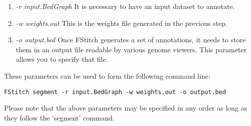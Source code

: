 \documentclass[12pt,letterpaper]{article}
\begin{document}
\begin{enumerate}
 \item \textit{-r input.BedGraph} It is necessary to have an input dataset to annotate.
 \item \textit{-w weights.out} This is the weights file generated in the previous step.
 \item \textit{-o output.bed} Once FStitch generates a set of annotations, it needs to store them in an output file readable by various genome viewers. This parameter allows you to specify that file.
\end{enumerate}

These parameters can be used to form the following command line:
\begin{verbatim}
FStitch segment -r input.BedGraph -w weights.out -o output.bed
\end{verbatim}

Please note that the above parameters may be specified in any order as long as they follow the `segment' command.
\end{document}
